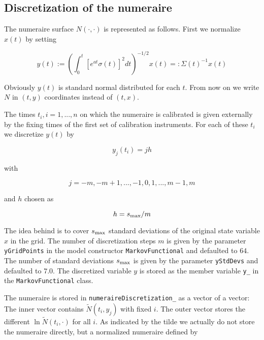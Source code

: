 \documentclass{amsart}
\theoremstyle{plain}
\numberwithin{equation}{section}
\begin{document}
\subsection{Discretization of the numeraire}

The numeraire surface $N(\cdot,\cdot)$ is represented as follows. First we normalize $x(t)$ by setting

\begin{equation}
y(t) := \left( \int_{0}^{t} \left[ e^{at} \sigma(t) \right]^2 dt \right) ^{-1/2} x(t) =: \Sigma(t)^{-1} x(t)
\end{equation}

Obviously $y(t)$ is standard normal distributed for each $t$. From now on we write $N$ in $(t,y)$ coordinates instead of $(t,x)$.

The times $t_i, i=1,...,n$ on which the numeraire is calibrated is given externally by the fixing times of the first set of calibration instruments. For each of these $t_i$ we discretize $y(t)$ by

\begin{equation}
y_j(t_i) = jh
\end{equation}

with

\begin{equation}
j=-m,-m+1,...,-1,0,1,...,m-1,m
\end{equation}

and $h$ chosen as

\begin{equation}
h = s_{\textnormal{max}} / m
\end{equation}

The idea behind is to cover $s_{\textnormal{max}}$ standard deviations of the original state variable $x$ in the grid.
The number of discretization steps $m$ is given by the parameter \verb+yGridPoints+ in the model constructor \verb+MarkovFunctional+ and defaulted to $64$.
The number of standard deviations $s_{\textnormal{max}}$ is given by the parameter \verb+yStdDevs+ and defaulted to $7.0$. The discretized variable $y$ is stored as the member variable \verb+y_+ in the \verb+MarkovFunctional+ class.

The numeraire is stored in \verb+numeraireDiscretization_+ as a vector of a vector: The inner vector contains $\tilde{N}(t_i,y_j)$ with fixed $i$. The outer vector stores the different $\ln\tilde{N}(t_i,\cdot)$ for all $i$. As indicated by the tilde we actually do not store the numeraire directly, but a normalized numeraire defined by
\end{document}
